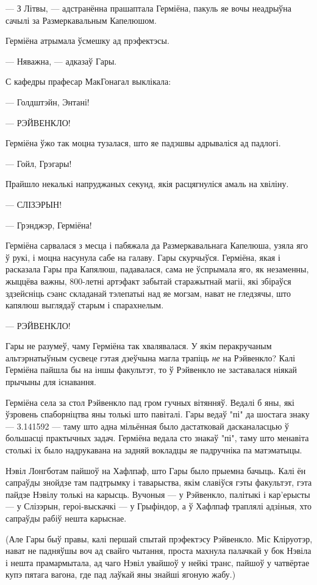 --- З Літвы, --- адстранённа прашаптала Герміёна, пакуль яе вочы неадрыўна сачылі за
Размеркавальным Капелюшом. 

Герміёна атрымала ўсмешку ад прэфектэсы.

--- Няважна, --- адказаў Гары.

С кафедры прафесар МакГонагал выклікала:

--- Голдштэйн, Энтані!

--- РЭЙВЕНКЛО!

Герміёна ўжо так моцна тузалася, што яе падэшвы адрываліся ад падлогі.

--- Гойл, Грэгары!

Прайшло некалькі напруджаных секунд, якія расцягнуліся амаль на хвіліну. 

--- СЛІЗЭРЫН!

--- Грэнджэр, Герміёна!

Герміёна сарвалася з месца і пабяжала да Размеркавальнага Капелюша, узяла яго ў рукі,
і моцна насунула сабе на галаву. Гары скурчыўся. Герміёна, якая і расказала Гары пра 
Капялюш, падавалася, сама не ўспрымала яго, як незаменны,
жыццёва важны, 800-летні артэфакт забытай старажытнай магіі, які збіраўся
здзейсніць сэанс складанай тэлепатыі над яе могзам, нават не гледзячы, што капялюш 
выглядаў старым і спарахнелым.  

--- РЭЙВЕНКЛО!

Гары не разумеў, чаму Герміёна так хвалявалася. У якім перакручаным альтэрнатыўным
сусвеце гэтая дзеўчына магла трапіць \emph{не} на Рэйвенкло? Калі Герміёна пайшла бы 
на іншы факультэт, то ў Рэйвенкло не заставалася ніякай прычыны для існавання.

Герміёна села за стол Рэйвенкло пад гром гучных вітянняў. Ведалі б яны, які 
ўзровень спаборніцтва яны толькі што павіталі. Гары ведаў "пі" да шостага знаку
--- 3.141592 --- таму што адна мільённая было дастатковай дасканаласцью ў большасці
практычных задач. Герміёна ведала сто знакаў "пі", таму што менавіта столькі іх было 
надрукавана на задняй вокладцы яе падручніка па матэматыцы.

Нэвіл Лонгботам пайшоў на Хафлпаф, што Гары было прыемна бачыць. Калі ён сапраўды 
знойдзе там падтрымку і таварыства, якім славіўся гэты факультэт, гэта
пайдзе Нэвілу толькі на карысць.
Вучоныя --- у Рэйвенкло, палітыкі і кар'ерысты --- у Слізэрын, героі-выскачкі --- у
Грыфіндор, а ў Хафлпаф траплялі адзіныя, хто сапраўды рабіў нешта карыснае.

(Але Гары быў правы, калі першай спытай прэфектэсу Рэйвенкло. Міс Кліруотэр, нават
не падняўшы воч ад свайго чытання, проста махнула
палачкай у бок Нэвіла і нешта прамармытала, ад чаго Нэвіл увайшоў у нейкі транс,
пайшоў у чатвёртае купэ  пятага вагона, где пад лаўкай яны знайші ягоную жабу.)

